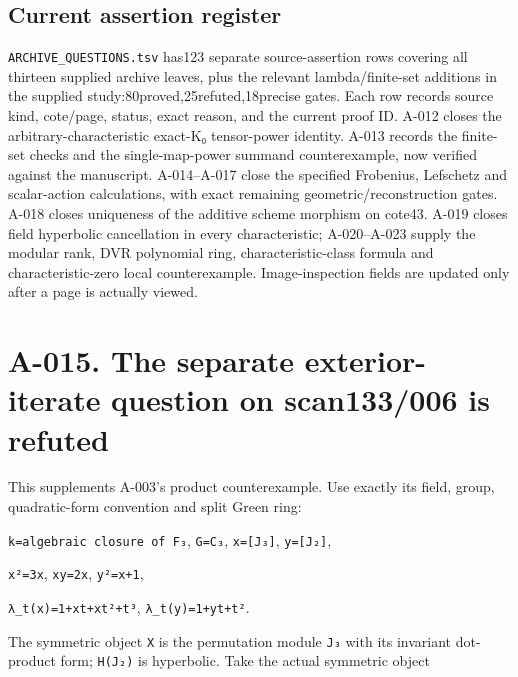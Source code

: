 \documentclass[
  10pt,
]{article}
\begin{document}
\subsection{Current assertion
register}\label{current-assertion-register}

\texttt{\small ARCHIVE\_\allowbreak{}QUESTIONS.tsv} has123 separate
source-assertion rows covering all thirteen supplied archive leaves,
plus the relevant lambda/finite-set additions in the supplied
study:80proved,25refuted,18precise gates. Each row records source kind,
cote/page, status, exact reason, and the current proof ID. A-012 closes
the arbitrary-characteristic exact-K₀ tensor-power identity. A-013
records the finite-set checks and the single-map-power summand
counterexample, now verified against the manuscript. A-014--A-017 close
the specified Frobenius, Lefschetz and scalar-action calculations, with
exact remaining geometric/reconstruction gates. A-018 closes uniqueness
of the additive scheme morphism on cote43. A-019 closes field hyperbolic
cancellation in every characteristic; A-020--A-023 supply the modular
rank, DVR polynomial ring, characteristic-class formula and
characteristic-zero local counterexample. Image-inspection fields are
updated only after a page is actually viewed.

\section{A-015. The separate exterior-iterate question on scan133/006 is
refuted}\label{a-015.-the-separate-exterior-iterate-question-on-scan133006-is-refuted}

This supplements A-003's product counterexample. Use exactly its field,
group, quadratic-form convention and split Green ring:

\texttt{\small k=\allowbreak{}algebraic closure of F₃},
\texttt{\small G=\allowbreak{}C₃},
\texttt{\small x=\allowbreak{}[\allowbreak{}J₃]\allowbreak{}},
\texttt{\small y=\allowbreak{}[\allowbreak{}J₂]\allowbreak{}},

\texttt{\small x²=\allowbreak{}3x}, \texttt{\small xy=\allowbreak{}2x},
\texttt{\small y²=\allowbreak{}x+\allowbreak{}1},

\texttt{\small λ\_\allowbreak{}t(\allowbreak{}x)\allowbreak{}=\allowbreak{}1+\allowbreak{}xt+\allowbreak{}xt²+\allowbreak{}t³},
\texttt{\small λ\_\allowbreak{}t(\allowbreak{}y)\allowbreak{}=\allowbreak{}1+\allowbreak{}yt+\allowbreak{}t²}.

The symmetric object \texttt{\small X} is the permutation module
\texttt{\small J₃} with its invariant dot-product form;
\texttt{\small H(\allowbreak{}J₂)\allowbreak{}} is hyperbolic. Take the
actual symmetric object
\end{document}
